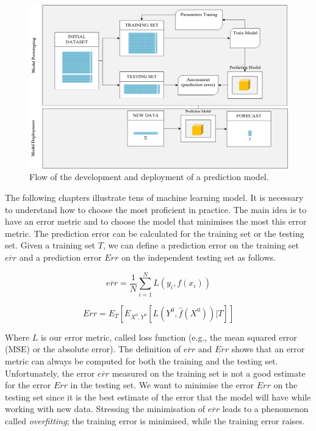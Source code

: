 \begin{figure}[hbt!]
\centering
\includegraphics[width=1\textwidth]{SectionLetsMath/linearRegression_figures/fig_trainTest.png}
\captionsetup{type=figure}
\caption{Flow of the development and deployment of a prediction model.}
\label{fig_trainTest}
\end{figure}

The following chapters illustrate tens of machine learning model. It is necessary to understand how to choose the most proficient in practice. The main idea is to have an error metric and to choose the model that minimises the most this error metric. The prediction error can be calculated for the training set or the testing set. Given a training set $T$, we can define a prediction error on the training set  $\overline{err}$ and a prediction error $Err$ on the independent testing set as follows.

\begin{equation}
\overline{err}=\frac{1}{N}\sum_{i=1}^{N}L\left(y_i,f\left(x_i\right)\right)
\label{eq_trainTestError1}
\end{equation}

\begin{equation}
Err=E_{T}\left[E_{X^0,Y^0}\left[L\left(Y^0,\hat{f}(X^0)\right)|T\right]\right]
\label{eq_trainTestError2}
\end{equation}

Where $L$ is our error metric, called loss function (e.g., the mean squared error (MSE) or the absolute error). The definition of $\overline{err}$ and $Err$ shows that an error metric can always be computed for both the training and the testing set. Unfortunately, the error $\overline{err}$ measured on the training set is not a good estimate for the error $Err$ in the testing set. We want to minimise the error $Err$ on the testing set since it is the best estimate of the error that the model will have while working with new data. Stressing the minimisation of $\overline{err}$ leads to a phenomenon called \textit{overfitting}; the training error is minimised, while the training error raises.\par

